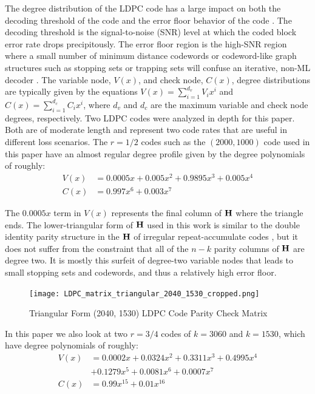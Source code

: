 \documentclass[conference]{IEEEtran}
\begin{document}
The degree distribution of the LDPC code has a large impact on both the decoding threshold of the code and the error floor behavior of the code \cite{luby-01}.  The decoding threshold is the signal-to-noise (SNR) level at which the coded block error rate drops precipitously.  The error floor region is the high-SNR region where a small number of minimum distance codewords or codeword-like graph structures such as stopping sets or trapping sets will confuse an iterative, non-ML decoder \cite{cole_2-06}.  The variable node, $V(x)$, and check node, $C(x)$, degree distributions are typically given by the equations $V(x) = \sum_{i = 1}^{d_v} V_i x^i$ and $C(x) = \sum_{i = 1}^{d_c} C_i x^i$, where $d_v$ and $d_c$ are the maximum variable and check node degrees, respectively.  Two LDPC codes were analyzed in depth for this paper.  Both are of moderate length and represent two code rates that are useful in different loss scenarios.  The $r={1}/{2}$ codes such as the $(2000, 1000)$ code used in this paper have an almost regular degree profile given by the degree polynomials of roughly:
\begin{align*}
  V(x) &= 0.0005x + 0.005x^2 + 0.9895x^3 + 0.005x^4 \\
  C(x) &= 0.997x^6 + 0.003x^7
\end{align*}

The $0.0005x$ term in $V(x)$ represents the final column of $\bf{H}$ where the triangle ends.  The lower-triangular form of $\bf{H}$ used in this work is similar to the double identity parity structure in the $\bf{H}$ of irregular repeat-accumulate codes \cite{Jin-2000}, but it does not suffer from the constraint that all of the $n-k$ parity columns of $\bf{H}$ are degree two.  It is mostly this surfeit of degree-two variable nodes that leads to small stopping sets and codewords, and thus a relatively high error floor.  

\begin{figure}[!ht]
\centering
\texttt{[image: LDPC\_matrix\_triangular\_2040\_1530\_cropped.png]}
\caption{Triangular Form (2040, 1530) LDPC Code Parity Check Matrix  \label{fig:LDPC_matrix_triangular}}
\end{figure}

In this paper we also look at two $r={3}/{4}$ codes of $k=3060$ and $k=1530$, which have degree polynomials of roughly:
\begin{align*}
  V(x) &= 0.0002x + 0.0324x^2 + 0.3311x^3 + 0.4995x^4 \\
       & + 0.1279x^5 + 0.0081x^6  + 0.0007x^7 \\
  C(x) &= 0.99x^{15} + 0.01x^{16}
\end{align*}
\end{document}
